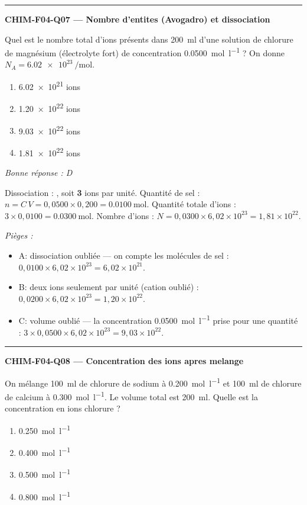 \documentclass[11pt,a4paper]{article}
\begin{document}
\vspace{8pt}\hrule\vspace{8pt}
\noindent\textbf{CHIM-F04-Q07 --- Nombre d'entites (Avogadro) et dissociation}\par
Quel est le nombre total d'ions présents dans \qty{200}{\milli\litre} d'une solution de chlorure de magnésium  (électrolyte fort) de concentration \qty{0.0500}{\mole\per\litre} ? On donne $N_A = \qty{6.02e23}{\per\mole}$.
\begin{enumerate}[label=\Alph*)]
\item \num{6.02e21} ions
\item \num{1.20e22} ions
\item \num{9.03e22} ions
\item \num{1.81e22} ions
\end{enumerate}
\textit{Bonne réponse : D}\par
Dissociation : , soit \textbf{3} ions par unité. Quantité de sel : $n = C\,V = 0{,}0500\times 0{,}200 = \qty{0.0100}{\mole}$. Quantité totale d'ions : $3\times 0{,}0100 = \qty{0.0300}{\mole}$. Nombre d'ions : $N = 0{,}0300\times 6{,}02\times 10^{23} = 1{,}81\times 10^{22}$.\par
\textit{Pièges :}
\begin{itemize}
\item A: dissociation oubliée --- on compte les molécules de sel : $0{,}0100\times 6{,}02\times 10^{23} = 6{,}02\times 10^{21}$.
\item B: deux ions seulement par unité (cation  oublié) : $0{,}0200\times 6{,}02\times 10^{23} = 1{,}20\times 10^{22}$.
\item C: volume oublié --- la concentration \qty{0.0500}{\mole\per\litre} prise pour une quantité : $3\times 0{,}0500\times 6{,}02\times 10^{23} = 9{,}03\times 10^{22}$.
\end{itemize}
\vspace{8pt}\hrule\vspace{8pt}
\noindent\textbf{CHIM-F04-Q08 --- Concentration des ions apres melange}\par
On mélange \qty{100}{\milli\litre} de chlorure de sodium  à \qty{0.200}{\mole\per\litre} et \qty{100}{\milli\litre} de chlorure de calcium  à \qty{0.300}{\mole\per\litre}. Le volume total est \qty{200}{\milli\litre}. Quelle est la concentration en ions chlorure  ?
\begin{enumerate}[label=\Alph*)]
\item \qty{0.250}{\mole\per\litre}
\item \qty{0.400}{\mole\per\litre}
\item \qty{0.500}{\mole\per\litre}
\item \qty{0.800}{\mole\per\litre}
\end{enumerate}
\end{document}
